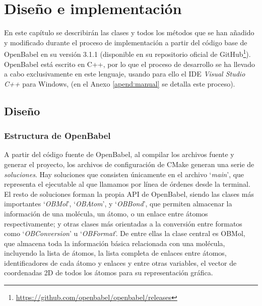 \chapter{Diseño e implementación}

En este capítulo se describirán las clases y todos los métodos que se han añadido y modificado durante el proceso de implementación a partir del código base de OpenBabel en su versión 3.1.1 (disponible en su repositorio oficial de GitHub\footnote{\url{https://github.com/openbabel/openbabel/releases}}). OpenBabel está escrito en C++, por lo que el proceso de desarrollo se ha llevado a cabo exclusivamente en este lenguaje, usando para ello el IDE \textit{Visual Studio C++} para Windows, (en el Anexo \ref{apend:manual} se detalla este proceso).


\section{Diseño}

\subsection{Estructura de OpenBabel}

A partir del código fuente de OpenBabel, al compilar los archivos fuente y generar el proyecto, los archivos de configuración de CMake generan una serie de \emph{soluciones}. Hay soluciones que consisten únicamente en el archivo `\textit{main}', que representa el ejecutable al que llamamos por línea de órdenes desde la terminal. El resto de soluciones forman la propia API de OpenBabel, siendo las clases más importantes `\textit{OBMol}', `\textit{OBAtom}', y `\textit{OBBond}', que permiten almacenar la información de una molécula, un átomo, o un enlace entre átomos respectivamente; y otras clases más orientadas a la conversión entre formatos como `\textit{OBConversion}' u `\textit{OBFormat}'. De entre ellas la clase central es OBMol, que almacena toda la información básica relacionada con una molécula, incluyendo la lista de átomos, la lista completa de enlaces entre átomos, identificadores de cada átomo y enlaces y entre otras variables, el vector de coordenadas 2D de todos los átomos para su representación gráfica.

